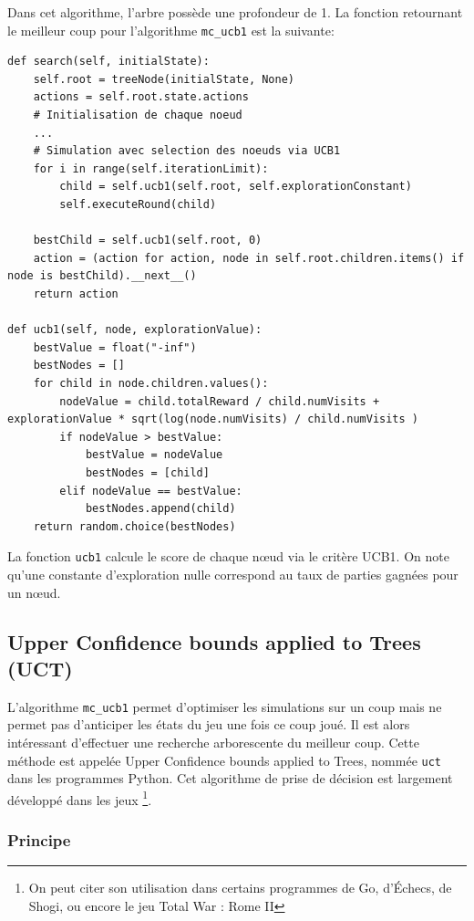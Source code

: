 \documentclass[a4paper]{article}
\theoremstyle{definition}
\begin{document}
Dans cet algorithme, l'arbre possède une profondeur de 1. La fonction retournant le meilleur coup pour l'algorithme \texttt{mc\_ucb1} est la suivante:

\begin{lstlisting}
def search(self, initialState):
	self.root = treeNode(initialState, None)
	actions = self.root.state.actions
	# Initialisation de chaque noeud
	...
	# Simulation avec selection des noeuds via UCB1
	for i in range(self.iterationLimit):
		child = self.ucb1(self.root, self.explorationConstant)
		self.executeRound(child)
		
	bestChild = self.ucb1(self.root, 0)
	action = (action for action, node in self.root.children.items() if node is bestChild).__next__()
	return action
	
def ucb1(self, node, explorationValue):
	bestValue = float("-inf")
	bestNodes = []
	for child in node.children.values():
		nodeValue = child.totalReward / child.numVisits + explorationValue * sqrt(log(node.numVisits) / child.numVisits )
		if nodeValue > bestValue:
			bestValue = nodeValue
			bestNodes = [child]
		elif nodeValue == bestValue:
			bestNodes.append(child)
	return random.choice(bestNodes)
\end{lstlisting}

La fonction \texttt{ucb1} calcule le score de chaque nœud via le critère UCB1. On note qu'une constante d'exploration nulle correspond au taux de parties gagnées pour un nœud.

\subsection{Upper Confidence bounds applied to Trees (UCT)}

L'algorithme \texttt{mc\_ucb1} permet d'optimiser les simulations sur un coup mais ne permet pas d'anticiper les états du jeu une fois ce coup joué. Il est alors intéressant d'effectuer une recherche arborescente du meilleur coup. Cette méthode est appelée Upper Confidence bounds applied to Trees, nommée \texttt{uct} dans les programmes Python. Cet algorithme de prise de décision est largement développé dans les jeux \footnote{On peut citer son utilisation dans certains programmes de Go, d'Échecs, de Shogi, ou encore le jeu Total War : Rome II}.

\subsubsection{Principe}
\end{document}
